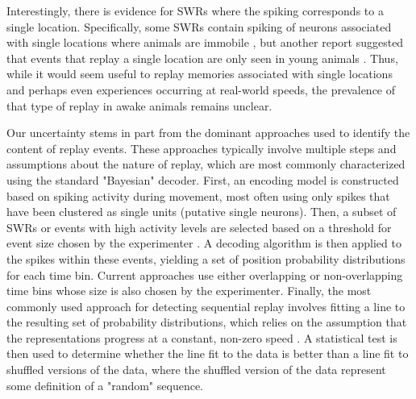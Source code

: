 \documentclass[9pt,lineno]{elife}
\begin{document}
Interestingly, there is evidence for SWRs where the spiking corresponds to a single location. Specifically, some SWRs contain spiking of neurons associated with single locations where animals are immobile \citep{YuDistincthippocampalcorticalmemory2017}, but another report suggested that events that replay a single location are only seen in young animals \citep{StellaHippocampalReactivationRandom2019}. Thus, while it would seem useful to replay memories associated with single locations and perhaps even experiences occurring at real-world speeds, the prevalence of that type of replay in awake animals remains unclear.

Our uncertainty stems in part from the dominant approaches used to identify the content of replay events. These approaches typically involve multiple steps and assumptions about the nature of replay, which are most commonly characterized using the standard "Bayesian" decoder. First, an encoding model is constructed based on spiking activity during movement, most often using only spikes that have been clustered as single units (putative single neurons). Then, a subset of SWRs or events with high activity levels are selected based on a threshold for event size chosen by the experimenter \citep{FosterReversereplaybehavioural2006, DibaForwardreversehippocampal2007a, KarlssonAwakereplayremote2009, StellaHippocampalReactivationRandom2019}. A decoding algorithm is then applied to the spikes within these events, yielding a set of position probability distributions for each time bin. Current approaches use either overlapping or non-overlapping time bins whose size is also chosen by the experimenter. Finally, the most commonly used approach for detecting sequential replay involves fitting a line to the resulting set of probability distributions, which relies on the assumption that the representations progress at a constant, non-zero speed \citep{FosterReversereplaybehavioural2006, DibaForwardreversehippocampal2007a, KarlssonAwakereplayremote2009}. A statistical test is then used to determine whether the line fit to the data is better than a line fit to shuffled versions of the data, where the shuffled version of the data represent some definition of a "random" sequence.
\end{document}
